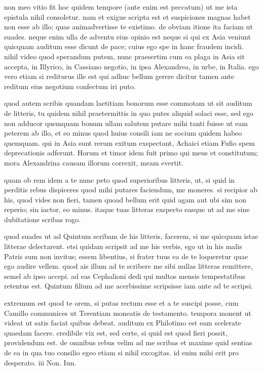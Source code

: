 


 non meo vitio fit hoc quidem tempore (ante enim est peccatum) ut me ista epistula nihil consoletur. nam et exigue scripta est et suspiciones magnas habet non esse ab illo; quas animadvertisse te existimo. de obviam itione ita faciam ut suades. neque enim ulla de adventu eius opinio est neque si qui ex Asia veniunt quicquam auditum esse dicunt de pace; cuius ego spe in hanc fraudem incidi. nihil video quod sperandum putem, nunc praesertim cum ea plaga in Asia sit accepta, in Illyrico, in Cassiano negotio, in ipsa Alexandrea, in urbe, in Italia. ego vero etiam si rediturus ille est qui adhuc bellum gerere dicitur tamen ante reditum eius negotium confectum iri puto.

 quod autem scribis quandam laetitiam bonorum esse commotam ut sit auditum de litteris, tu quidem nihil praetermittis in quo putes aliquid solaci esse, sed ego non adducor quemquam bonum ullam salutem putare mihi tanti fuisse ut eam peterem ab illo, et eo minus quod huius consili iam ne socium quidem habeo quemquam. qui in Asia sunt rerum exitum exspectant, Achaici etiam Fufio spem deprecationis adferunt. Horum et timor idem fuit primo qui meus et constitutum; mora Alexandrina causam illorum correxit, meam evertit.

 quam ob rem idem a te nunc peto quod superioribus litteris, ut, si quid in perditis rebus dispiceres quod mihi putares faciendum, me moneres. si recipior ab his, quod vides non fieri, tamen quoad bellum erit quid agam aut ubi sim non reperio; sin iactor, eo minus. itaque tuas litteras exspecto easque ut ad me sine dubitatione scribas rogo.

 quod suades ut ad Quintum scribam de his litteris, facerem, si me quicquam istae litterae delectarent. etsi quidam scripsit ad me his verbis, ego ut in his malis Patris sum non invitus; essem libentius, si frater tuus ea de te loqueretur quae ego audire vellem. quod ais illum ad te scribere me sibi nullas litteras remittere, semel ab ipso accepi. ad eas Cephalioni dedi qui multos mensis tempestatibus retentus est. Quintum filium ad me acerbissime scripsisse iam ante ad te scripsi.

 extremum est quod te orem, si putas rectum esse et a te suscipi posse, cum Camillo communices ut Terentiam moneatis de testamento. tempora monent ut videat ut satis faciat quibus debeat. auditum ex Philotimo est eam scelerate quaedam facere. credibile vix est, sed certe, si quid est quod fieri possit, providendum est. de omnibus rebus velim ad me scribas et maxime quid sentias de ea in qua tuo consilio egeo etiam si nihil excogitas. id enim mihi erit pro desperato. iii Non. Iun.
